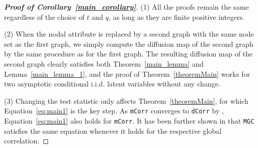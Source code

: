 \documentclass[12pt]{article}
\theoremstyle{definition}
\begin{document}
	\begin{proof}[\textbf{Proof of Corollary~\ref{main_corollary}}] 
		(1) All the proofs remain the same regardless of the choice of $t$ and $q$, as long as they are finite positive integers.
		
		(2) When the nodal attribute is replaced by a second graph with the same node set as the first graph, we simply compute the diffusion map of the second graph by the same procedure as for the first graph. The resulting diffusion map of the second graph clearly satisfies both Theorem~\ref{main_lemma} and Lemma~\ref{main_lemma_1}, and the proof of Theorem~\ref{theoremMain} works for two asymptotic conditional i.i.d. latent variables without any change.
		
		(3) Changing the test statistic only affects Theorem~\ref{theoremMain}, for which Equation~\ref{eq:main1} is the key step. As \texttt{mCorr} converges to \texttt{dCorr} by \cite{szekely2013distance}, Equation~\ref{eq:main1} also holds for \texttt{mCorr}. It has been further shown in \cite{shen2016discovering} that \texttt{MGC} satisfies the same equation whenever it holds for the respective global correlation. 
	\end{proof}
	
\end{document}
